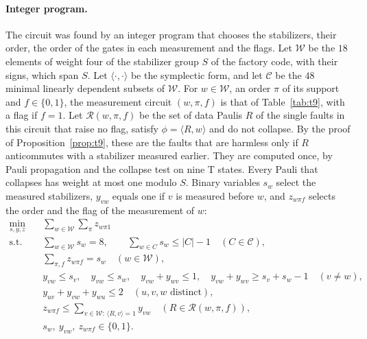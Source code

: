 \documentclass[aps,prl,reprint,twocolumn,amsmath,amssymb,floatfix,nofootinbib,superscriptaddress]{revtex4-2}
\theoremstyle{definition}
\theoremstyle{remark}
\begin{document}
\paragraph*{Integer program.}
The circuit was found by an integer program that chooses the stabilizers, their order, the order of the gates in each measurement and the flags. Let $\mathcal W$ be the $18$ elements of weight four of the stabilizer group $S$ of the factory code, with their signs, which span $S$. Let $\langle\cdot,\cdot\rangle$ be the symplectic form, and let $\mathcal C$ be the $48$ minimal linearly dependent subsets of $\mathcal W$. For $w\in\mathcal W$, an order $\pi$ of its support and $f\in\{0,1\}$, the measurement circuit $(w,\pi,f)$ is that of Table~\ref{tab:t9}, with a flag if $f=1$. Let $\mathcal R(w,\pi,f)$ be the set of data Paulis $R$ of the single faults in this circuit that raise no flag, satisfy $\phi=\langle R,w\rangle$ and do not collapse. By the proof of Proposition~\ref{prop:t9}, these are the faults that are harmless only if $R$ anticommutes with a stabilizer measured earlier. They are computed once, by Pauli propagation and the collapse test on nine T states. Every Pauli that collapses has weight at most one modulo $S$. Binary variables $s_w$ select the measured stabilizers, $y_{vw}$ equals one if $v$ is measured before $w$, and $z_{w\pi f}$ selects the order and the flag of the measurement of $w$:
\begin{align*}
\min_{s,y,z}\quad&\sum_{w\in\mathcal W}\sum_{\pi}z_{w\pi1}\\
\text{s.t.}\quad&\textstyle\sum_{w\in\mathcal W}s_w=8,\qquad \sum_{w\in C}s_w\leq|C|-1\quad(C\in\mathcal C),\\
&\textstyle\sum_{\pi,f}z_{w\pi f}=s_w\quad(w\in\mathcal W),\\
&y_{vw}\leq s_v,\quad y_{vw}\leq s_w,\quad y_{vw}+y_{wv}\leq1,\quad y_{vw}+y_{wv}\geq s_v+s_w-1\quad(v\neq w),\\
&y_{uv}+y_{vw}+y_{wu}\leq2\quad(u,v,w\text{ distinct}),\\
&\textstyle z_{w\pi f}\leq\sum_{v\in\mathcal W:\,\langle R,v\rangle=1}y_{vw}\quad(R\in\mathcal R(w,\pi,f)),\\
&s_w,\ y_{vw},\ z_{w\pi f}\in\{0,1\}.
\end{align*}
\end{document}

